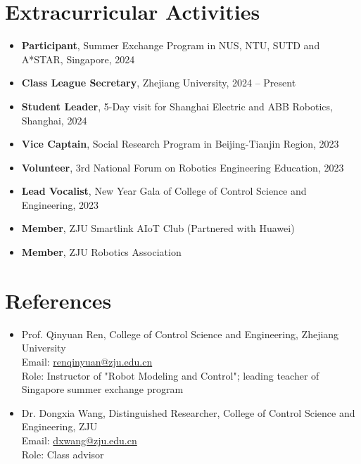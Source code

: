 \documentclass[a4paper,10pt]{article}
\begin{document}
\section*{Extracurricular Activities}
\begin{itemize}
    \item \textbf{Participant}, Summer Exchange Program in NUS, NTU, SUTD and A*STAR, Singapore, 2024
    \item \textbf{Class League Secretary}, Zhejiang University, 2024 -- Present
    \item \textbf{Student Leader}, 5-Day visit for Shanghai Electric and ABB Robotics, Shanghai, 2024
    \item \textbf{Vice Captain}, Social Research Program in Beijing-Tianjin Region, 2023
    \item \textbf{Volunteer}, 3rd National Forum on Robotics Engineering Education, 2023
    \item \textbf{Lead Vocalist}, New Year Gala of College of Control Science and Engineering, 2023
    \item \textbf{Member}, ZJU Smartlink AIoT Club (Partnered with Huawei)
    \item \textbf{Member}, ZJU Robotics Association

\end{itemize}

\section*{References}
\begin{itemize}
    \item Prof. Qinyuan Ren, College of Control Science and Engineering, Zhejiang University \\
    Email: \href{mailto:renqinyuan@zju.edu.cn}{renqinyuan@zju.edu.cn} \\
    Role: Instructor of "Robot Modeling and Control"; leading teacher of Singapore summer exchange program

    \item Dr. Dongxia Wang, Distinguished Researcher, College of Control Science and Engineering, ZJU \\
    Email: \href{mailto:dxwang@zju.edu.cn}{dxwang@zju.edu.cn} \\
    Role: Class advisor
\end{itemize}
\end{document}
